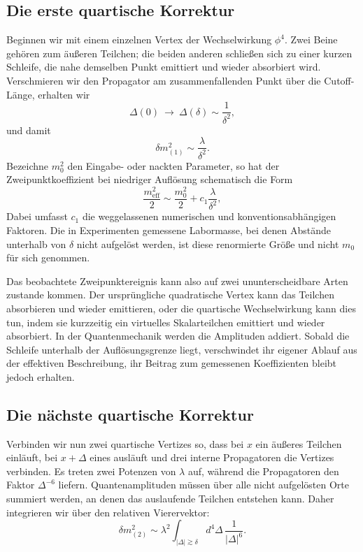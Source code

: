 \subsection{Die erste quartische Korrektur}

Beginnen wir mit einem einzelnen Vertex der Wechselwirkung \(\phi^4\). Zwei Beine gehören zum äußeren Teilchen; die beiden anderen schließen sich zu einer kurzen Schleife, die nahe demselben Punkt emittiert und wieder absorbiert wird. Verschmieren wir den Propagator am zusammenfallenden Punkt über die Cutoff-Länge, erhalten wir \begin{equation}
\Delta(0)\ \longrightarrow\ \Delta(\delta)\sim\frac{1}{\delta^2},
\end{equation}und damit \begin{equation}
\delta m^2_{(1)}\sim\frac{\lambda}{\delta^2}.
\label{eq:one-loop-scalar-mass}
\end{equation}Bezeichne \(m_0^2\) den Eingabe- oder nackten Parameter, so hat der Zweipunktkoeffizient bei niedriger Auflösung schematisch die Form \begin{equation}
\frac{m_{\mathrm{eff}}^2}{2}
\sim
\frac{m_0^2}{2}
+c_1\frac{\lambda}{\delta^2},
\label{eq:first-renormalized-mass}
\end{equation}Dabei umfasst \(c_1\) die weggelassenen numerischen und konventionsabhängigen Faktoren. Die in Experimenten gemessene Labormasse, bei denen Abstände unterhalb von \(\delta\) nicht aufgelöst werden, ist diese renormierte Größe und nicht \(m_0\) für sich genommen.

Das beobachtete Zweipunktereignis kann also auf zwei ununterscheidbare Arten zustande kommen. Der ursprüngliche quadratische Vertex kann das Teilchen absorbieren und wieder emittieren, oder die quartische Wechselwirkung kann dies tun, indem sie kurzzeitig ein virtuelles Skalarteilchen emittiert und wieder absorbiert. In der Quantenmechanik werden die Amplituden addiert. Sobald die Schleife unterhalb der Auflösungsgrenze liegt, verschwindet ihr eigener Ablauf aus der effektiven Beschreibung, ihr Beitrag zum gemessenen Koeffizienten bleibt jedoch erhalten.

\subsection{Die nächste quartische Korrektur}

Verbinden wir nun zwei quartische Vertizes so, dass bei \(x\) ein äußeres Teilchen einläuft, bei \(x+\Delta\) eines ausläuft und drei interne Propagatoren die Vertizes verbinden. Es treten zwei Potenzen von \(\lambda\) auf, während die Propagatoren den Faktor \(\Delta^{-6}\) liefern. Quantenamplituden müssen über alle nicht aufgelösten Orte summiert werden, an denen das auslaufende Teilchen entstehen kann. Daher integrieren wir über den relativen Vierervektor: \begin{equation}
\delta m^2_{(2)}
\sim
\lambda^2
\int_{|\Delta|\gtrsim\delta}
d^4\Delta\,\frac{1}{|\Delta|^6}.
\label{eq:two-loop-power-count}
\end{equation}

